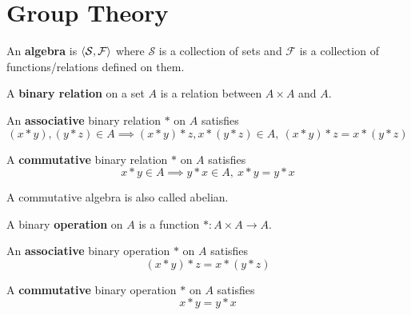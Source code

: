 \section{Group Theory}
\begin{definition}
	An \textbf{algebra} is $\left\langle \mathcal{S},\mathcal{F} \right\rangle$ where $\mathcal{S}$ is a collection of sets and $\mathcal{F}$ is a collection of functions/relations defined on them.
\end{definition}

\begin{definition}
	A \textbf{binary relation} on a set $A$ is a relation between $A \times A$ and $A$.
\end{definition}

\begin{definition}
	An \textbf{associative} binary relation $\ast$ on $A$ satisfies
	\begin{equation}
		(x \ast y),(y \ast z) \in A \implies (x \ast y) \ast z, x \ast (y \ast z) \in A,\ (x \ast y) \ast z = x \ast (y \ast z)
	\end{equation}
\end{definition}

\begin{definition}
	A \textbf{commutative} binary relation $\ast$ on $A$ satisfies
	\begin{equation}
		x \ast y \in A \implies y \ast x \in A,\ x \ast y = y \ast x
	\end{equation}
\end{definition}
	A commutative algebra is also called abelian.

\begin{definition}
	A binary \textbf{operation} on $A$ is a function $\ast : A \times A \to A$.
\end{definition}

\begin{definition}
	An \textbf{associative} binary operation $\ast$ on $A$ satisfies
	\begin{equation}
		(x \ast y) \ast z = x \ast (y \ast z)
	\end{equation}
\end{definition}

\begin{definition}
	A \textbf{commutative} binary operation $\ast$ on $A$ satisfies
	\begin{equation}
		x \ast y = y \ast x
	\end{equation}
\end{definition}

